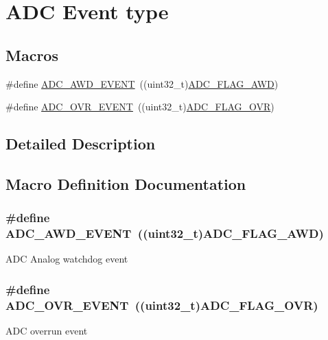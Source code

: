 \hypertarget{group___a_d_c___event__type}{\section{A\-D\-C Event type}
\label{group___a_d_c___event__type}
}
\subsection*{Macros}
\begin{DoxyCompactItemize}
\item 
\#define \hyperlink{group___a_d_c___event__type_ga2d1d545ea1bfecba7a7081be6ef2cb93}{A\-D\-C\-\_\-\-A\-W\-D\-\_\-\-E\-V\-E\-N\-T}~((uint32\-\_\-t)\hyperlink{group___a_d_c__flags__definition_gadb75a4b430fb84950232b7a8f3a6a877}{A\-D\-C\-\_\-\-F\-L\-A\-G\-\_\-\-A\-W\-D})
\item 
\#define \hyperlink{group___a_d_c___event__type_gae1ef5aaecb2d24cac50a59f1bc311221}{A\-D\-C\-\_\-\-O\-V\-R\-\_\-\-E\-V\-E\-N\-T}~((uint32\-\_\-t)\hyperlink{group___a_d_c__flags__definition_ga6e8f399d2af342bd18b9f5803cb986e7}{A\-D\-C\-\_\-\-F\-L\-A\-G\-\_\-\-O\-V\-R})
\end{DoxyCompactItemize}


\subsection{Detailed Description}


\subsection{Macro Definition Documentation}
\hypertarget{group___a_d_c___event__type_ga2d1d545ea1bfecba7a7081be6ef2cb93}{
\subsubsection[{A\-D\-C\-\_\-\-A\-W\-D\-\_\-\-E\-V\-E\-N\-T}]{\setlength{\rightskip}{0pt plus 5cm}\#define A\-D\-C\-\_\-\-A\-W\-D\-\_\-\-E\-V\-E\-N\-T~((uint32\-\_\-t){\bf A\-D\-C\-\_\-\-F\-L\-A\-G\-\_\-\-A\-W\-D})}}\label{group___a_d_c___event__type_ga2d1d545ea1bfecba7a7081be6ef2cb93}
A\-D\-C Analog watchdog event \hypertarget{group___a_d_c___event__type_gae1ef5aaecb2d24cac50a59f1bc311221}{
\subsubsection[{A\-D\-C\-\_\-\-O\-V\-R\-\_\-\-E\-V\-E\-N\-T}]{\setlength{\rightskip}{0pt plus 5cm}\#define A\-D\-C\-\_\-\-O\-V\-R\-\_\-\-E\-V\-E\-N\-T~((uint32\-\_\-t){\bf A\-D\-C\-\_\-\-F\-L\-A\-G\-\_\-\-O\-V\-R})}}\label{group___a_d_c___event__type_gae1ef5aaecb2d24cac50a59f1bc311221}
A\-D\-C overrun event 